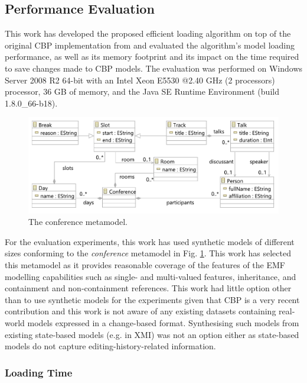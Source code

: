 \documentclass[12pt, a4paper]{report} \usepackage[titletoc]{appendix}
\begin{document}
\subsection{Performance Evaluation}
\label{subsec:performance_evaluation}
This work has developed the proposed efficient loading algorithm on top of the original CBP implementation from \cite{yohannis2017turning} and evaluated the algorithm's model loading performance, as well as its memory footprint and its impact on the time required to save changes made to CBP models. The evaluation was performed on Windows Server 2008 R2 64-bit with an Intel Xeon E5530 @2.40 GHz (2 processors) processor, 36 GB of memory, and the Java SE Runtime Environment (build 1.8.0\_66-b18).

\begin{figure}[htbp]
	\centering
	\includegraphics[width=0.9\linewidth]{conference_metamodel}
	\caption{The conference metamodel.}   
	\label{fig:node_metamodel}
\end{figure}

For the evaluation experiments, this work has used synthetic models of different sizes conforming to the \emph{conference} metamodel in Fig. \ref{fig:node_metamodel}. This work has selected this metamodel as it provides reasonable coverage of the features of the EMF modelling capabilities such as single- and multi-valued features, inheritance, and containment and non-containment references. This work had little option other than to use synthetic models for the experiments given that CBP is a very recent contribution and this work is not aware of any existing datasets containing real-world models expressed in a change-based format. Synthesising such models from existing state-based models (e.g. in XMI) was not an option either as state-based models do not capture editing-history-related information.    

\subsubsection{Loading Time}
\label{subsec:loading_time_test}
\end{document}
